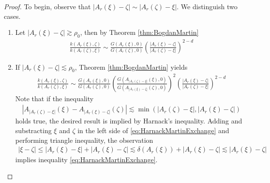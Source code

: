\documentclass[a4paper,12pt]{article}
\theoremstyle{definition}
\theoremstyle{definition}
\begin{document}
	\begin{proof}
		To begin, observe that $|A_r(\xi)-\zeta|\sim|A_r(\zeta)-\xi|$. We distinguish two cases. 
		\begin{enumerate}
			\item Let $|A_r(\xi)-\zeta|\gtrsim \rho_0$, then by Theorem \ref{thm:BogdanMartin}
			\begin{align*}
				\frac{k(A_r(\xi),\zeta)}{k(A_r(\zeta),\xi)}\sim\frac{G(A_r(\xi),0)}{G(A_r(\zeta),0)}\left(\frac{|A_r(\xi)-\zeta|}{|A_r(\zeta)-\xi|}\right)^{2-d} 
			\end{align*}
			\item	If $|A_r(\xi)-\zeta|\lesssim \rho_0$, Theorem \ref{thm:BogdanMartin} yields
			\begin{align*}
				\frac{k(A_r(\xi),\zeta)}{k(A_r(\zeta),\xi)}\sim\frac{G(A_r(\xi),0)}{G(A_r(\zeta),0)}\left(\frac{G(A_{|A_r(\zeta)-\xi|}(\xi),0)}{G(A_{|A_r(\xi)-\zeta|}(\zeta),0)}\right)^2\left(\frac{|A_r(\xi)-\zeta|}{|A_r(\zeta)-\xi|}\right)^{2-d}
			\end{align*} 
			Note that if the inequality
			\begin{align}\label{eq:HarnackMartinExchange}
				\left|A_{|A_r(\zeta)-\xi|}(\xi)-A_{|A_r(\xi)-\zeta|}(\zeta)\right|\lesssim \min\left(|A_r(\zeta)-\xi|,|A_r(\xi)-\zeta|\right)
			\end{align}
			holds true, the desired result is implied by Harnack's inequality. Adding and substracting $\xi$ and $\zeta$ in the left side of \eqref{eq:HarnackMartinExchange} and performing triangle inequality, the observation 
			\begin{align*}
				|\xi-\zeta|\leq|A_r(\xi)-\xi|+|A_r(\xi)-\zeta|\lesssim \delta(A_r(\xi))+|A_r(\xi)-\zeta|\lesssim |A_r(\xi)-\zeta|
			\end{align*}
			implies inequality \eqref{eq:HarnackMartinExchange}.
		\end{enumerate}
	\end{proof}
	
\end{document}
